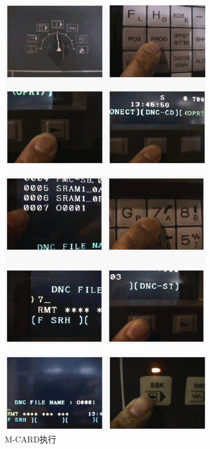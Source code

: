 \begin{figure}[!hbtp]
	\centering	\includegraphics[width=0.8\textwidth]{images/14-25}
\end{figure}
\begin{figure}[!hbtp]
	\centering	\includegraphics[width=0.8\textwidth]{images/14-26}
\end{figure}
\begin{figure}[!hbtp]
	\centering	\includegraphics[width=0.8\textwidth]{images/14-27}
	\caption{M-CARD执行} \label{M-CARD执行}
\end{figure}

